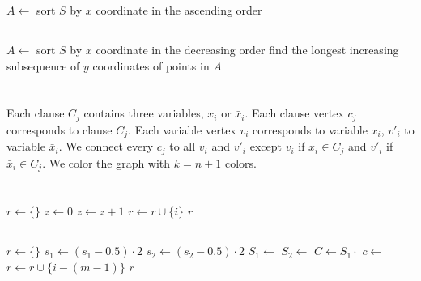 \documentclass[a4paper,11pt,oneside,onecolumn]{article}
\begin{document}
\begin{algorithmic}
\State $A \gets $ sort $S$ by $x$ coordinate in the ascending order
\State \Return {}
\end{algorithmic}

\subsection{}

\begin{algorithmic}
\State $A \gets $ sort $S$ by $x$ coordinate in the decreasing order
\State find the longest increasing subsequence of $y$ coordinates of points in $A$
\State {}
\end{algorithmic}

\section{}

Each clause $C_j$ contains three variables, $x_i$ or $\bar{x}_i$. Each clause vertex $c_j$ corresponds to clause $C_j$.
Each variable vertex $v_i$ corresponds to variable $x_i$, $v'_i$ to variable $\bar{x}_i$. We connect every $c_j$ to all $v_i$ and $v'_i$
except $v_i$ if $x_i \in C_j$ and $v'_i$  if $\bar{x}_i \in C_j$. We color the graph with $k = n+1$ colors.

\section{}

\subsection{}

\begin{algorithmic}
\State $r \gets \{\}$
    \State $z \gets 0$
            \State $z \gets z + 1$
        \EndIf
    \EndFor
        \State $r \gets r \cup \{i\}$
    \EndIf
\EndFor
\State \Return $r$
\end{algorithmic}

\subsection{}

\begin{algorithmic}
\State $r \gets \{\}$
\State $s_1 \gets (s_1 - 0.5) \cdot 2$  
\State $s_2 \gets (s_2 - 0.5) \cdot 2$  
\State $S_1 \gets $ 
\State $S_2 \gets $ 
\State $C \gets S_1 \cdot $  
\State $c \gets $  
        \State $r \gets r \cup \{i - (m - 1)\}$
    \EndIf
\EndFor
\State \Return $r$
\end{algorithmic}
\end{document}
